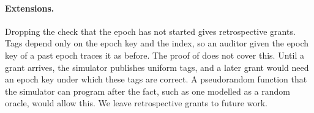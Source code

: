 \paragraph{Extensions.} Dropping the check that the epoch has not started gives
retrospective grants. Tags depend only on the epoch key and the index, so an
auditor given the epoch key of a past epoch traces it as before. The proof of
 does not cover this. Until a grant arrives, the simulator
publishes uniform tags, and a later grant would need an epoch key under which
these tags are correct. A pseudorandom function that the simulator can program
after the fact, such as one modelled as a random oracle, would allow this. We
leave retrospective grants to future work.
